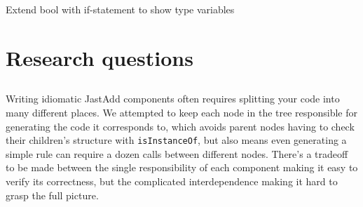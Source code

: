 \documentclass[nofilelist]{cslthse-msc}
\begin{document}
%
Extend bool with if-statement to show type variables
\section{Research questions}
\subsection{\rqone}

\subsection{\rqtwo}
\subsection{\rqthree}
Writing idiomatic JastAdd components often requires splitting your code into many different places.
We attempted to keep each node in the tree responsible for generating the code it corresponds to, which avoids parent nodes having to check their children's structure with \verb|isInstanceOf|, but also means even generating a simple rule can require a dozen calls between different nodes.
There's a tradeoff to be made between the single responsibility of each component making it easy to verify its correctness, but the complicated interdependence making it hard to grasp the full picture.
\end{document}
